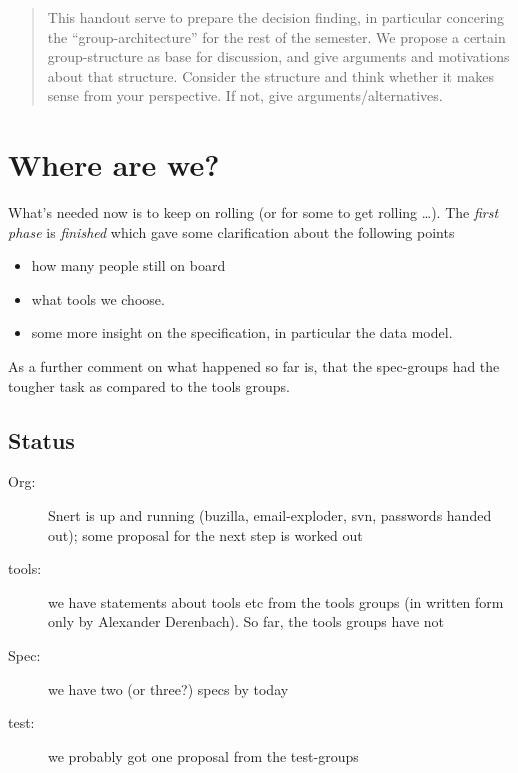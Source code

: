 \documentclass[11pt,handout]{handout}
\begin{document}
\thispagestyle{empty}





\begin{abstract}
  This handout serve to prepare the decision finding, in particular
  concering the ``group-architecture'' for the rest of the semester. We
  propose a certain group-structure as base for discussion, and give
  arguments and motivations about that structure. Consider the structure
  and think whether it makes sense from your perspective. If not, give
  arguments/alternatives.
\end{abstract}

\section*{Where are we?}



What's needed now is to keep on rolling (or for some to get rolling
\ldots). The \emph{first phase} is \emph{finished} which gave some
clarification about the following points

\begin{itemize}
\item how many people still on board
\item what tools we choose.
\item some more insight on the specification, in particular the data model.
\end{itemize}

As a further comment on what happened so far is, that the spec-groups had
the tougher task as compared to the tools groups.


\subsection*{Status}




\begin{description}
\item[Org:] Snert is up and running (buzilla, email-exploder, svn,
  passwords handed out); some proposal for the next step is worked out
\item[tools:] we have statements about tools etc from the tools groups (in
  written form only by Alexander Derenbach). So far, the tools groups have not
\item[Spec:] we have two (or three?) specs by today
\item[test:] we probably got one proposal from the test-groups
\end{description}
\end{document}
